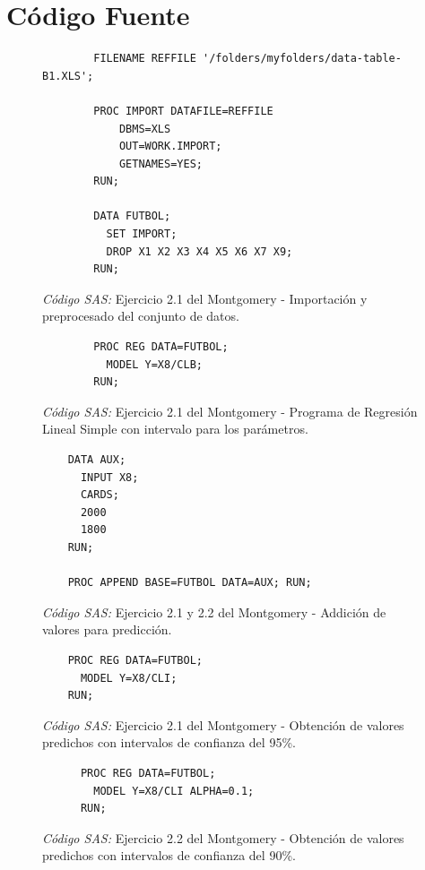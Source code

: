 \documentclass{article}
\begin{document}
    \part{Código Fuente}

      \begin{figure}[!h]
        \centering
        \begin{verbatim}
        FILENAME REFFILE '/folders/myfolders/data-table-B1.XLS';

        PROC IMPORT DATAFILE=REFFILE
	        DBMS=XLS
	        OUT=WORK.IMPORT;
	        GETNAMES=YES;
        RUN;

        DATA FUTBOL;
          SET IMPORT;
          DROP X1 X2 X3 X4 X5 X6 X7 X9;
        RUN;
      \end{verbatim}
      \caption{\emph{Código SAS:} Ejercicio 2.1 del Montgomery - Importación y preprocesado del conjunto de datos.}
      \label{code:sas-mont-1}
    \end{figure}


    \begin{figure}[!h]
      \centering
      \begin{verbatim}
        PROC REG DATA=FUTBOL;
          MODEL Y=X8/CLB;
        RUN;
    \end{verbatim}
    \caption{\emph{Código SAS:} Ejercicio 2.1 del Montgomery - Programa de Regresión Lineal Simple con intervalo para los parámetros.}
    \label{code:sas-mont-2}
  \end{figure}

  \begin{figure}[!h]
    \centering
    \begin{verbatim}
    DATA AUX;
      INPUT X8;
      CARDS;
      2000
      1800
    RUN;

    PROC APPEND BASE=FUTBOL DATA=AUX; RUN;
  \end{verbatim}
  \caption{\emph{Código SAS:} Ejercicio 2.1 y 2.2 del Montgomery - Addición de valores para predicción.}
  \label{code:sas-mont-3}
\end{figure}

\begin{figure}[!h]
  \centering
  \begin{verbatim}
    PROC REG DATA=FUTBOL;
      MODEL Y=X8/CLI;
    RUN;
  \end{verbatim}
  \caption{\emph{Código SAS:} Ejercicio 2.1 del Montgomery - Obtención de valores predichos con intervalos de confianza del 95\%.}
  \label{code:sas-mont-4}
  \end{figure}

  \begin{figure}[!h]
    \centering
    \begin{verbatim}
      PROC REG DATA=FUTBOL;
        MODEL Y=X8/CLI ALPHA=0.1;
      RUN;
    \end{verbatim}
    \caption{\emph{Código SAS:} Ejercicio 2.2 del Montgomery - Obtención de valores predichos con intervalos de confianza del 90\%.}
    \label{code:sas-mont-5}
    \end{figure}
\end{document}
